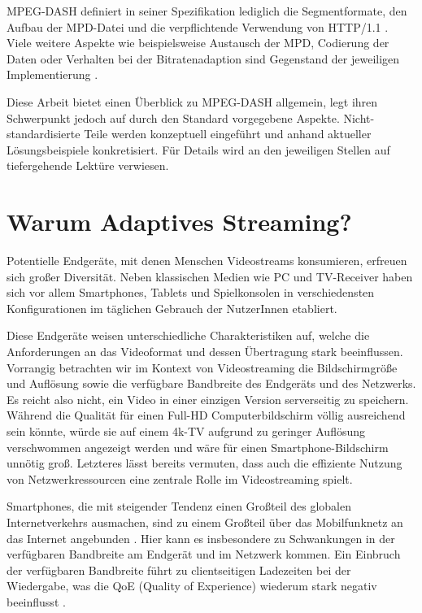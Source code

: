 \documentclass[paper = a4, fontsize = 12pt, parskip = half]{scrartcl} %
\begin{document}
MPEG-DASH definiert in seiner Spezifikation lediglich die Segmentformate, den Aufbau der MPD-Datei und die verpflichtende Verwendung von HTTP/1.1 \cite{mpeg_dynamic_2013}. Viele weitere Aspekte wie beispielsweise Austausch der MPD, Codierung der Daten oder Verhalten bei der Bitratenadaption sind Gegenstand der jeweiligen Implementierung \cite{sodagar_mpeg-dash_2011}.

Diese Arbeit bietet einen Überblick zu MPEG-DASH allgemein, legt ihren Schwerpunkt jedoch auf durch den Standard vorgegebene Aspekte.
Nicht-standardisierte Teile werden konzeptuell eingeführt und anhand aktueller Lösungsbeispiele konkretisiert. Für Details wird an den jeweiligen Stellen auf tiefergehende Lektüre verwiesen.

\section{Warum Adaptives Streaming?}
Potentielle Endgeräte, mit denen Menschen Videostreams konsumieren, erfreuen sich großer Diversität. Neben klassischen Medien wie PC und TV-Receiver haben sich vor allem Smartphones, Tablets und Spielkonsolen in verschiedensten Konfigurationen im täglichen Gebrauch der NutzerInnen etabliert.

Diese Endgeräte weisen unterschiedliche Charakteristiken auf, welche die Anforderungen an das Videoformat und dessen Übertragung stark beeinflussen. Vorrangig betrachten wir im Kontext von Videostreaming die Bildschirmgröße und Auflösung sowie die verfügbare Bandbreite des Endgeräts und des Netzwerks.
Es reicht also nicht, ein Video in einer einzigen Version serverseitig zu speichern. Während die Qualität für einen Full-HD Computerbildschirm völlig ausreichend sein könnte, würde sie auf einem 4k-TV aufgrund zu geringer Auflösung verschwommen angezeigt werden und wäre für einen Smartphone-Bildschirm unnötig groß. Letzteres lässt bereits vermuten, dass auch die effiziente Nutzung von Netzwerkressourcen eine zentrale Rolle im Videostreaming spielt.

Smartphones, die mit steigender Tendenz einen Großteil des globalen Internetverkehrs ausmachen, sind zu einem Großteil über das Mobilfunknetz an das Internet angebunden \cite{cisco_syst_inc_cisco_2017}. Hier kann es insbesondere zu Schwankungen in der verfügbaren Bandbreite am Endgerät und im Netzwerk kommen. Ein Einbruch der verfügbaren Bandbreite führt zu clientseitigen Ladezeiten bei der Wiedergabe, was die QoE (Quality of Experience) wiederum stark negativ beeinflusst \cite{seufert_survey_2015}.
\end{document}
